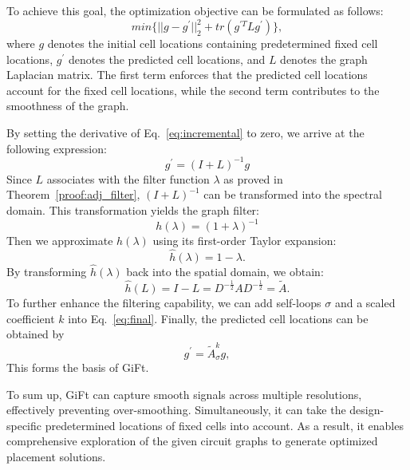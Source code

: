 To achieve this goal, the optimization objective can be formulated as follows:
\begin{equation}\label{eq:incremental}
min\{||g-g^{\prime}||_{2}^{2}+tr(g^{\prime T}Lg^{\prime})\},
\end{equation}
where $g$ denotes the initial cell locations containing predetermined fixed cell locations, $g^{\prime}$ denotes the predicted cell locations, and $L$ denotes the graph Laplacian matrix. 
The first term enforces that the predicted cell locations account for the fixed cell locations, while the second term contributes to the smoothness of the graph.

By setting the derivative of Eq.~\ref{eq:incremental} to zero, we arrive at the following expression:
\begin{equation}\label{eq:derivative}
g^{\prime}=(I+L)^{-1}g
\end{equation}
Since $L$ associates with the filter function $\lambda$ as proved in Theorem~\ref{proof:adj_filter}, $(I+L)^{-1}$ can be transformed into the spectral domain. This transformation yields the graph filter:
\begin{equation}\label{eq:spectral}
h(\lambda)=(1+\lambda)^{-1}
\end{equation}
Then we approximate $h(\lambda)$ using its first-order Taylor expansion: 
\begin{equation}\label{eq:taylor}
\hat{h}(\lambda)=1-\lambda.
\end{equation}
By transforming $\hat{h}(\lambda)$ back into the spatial domain, we obtain:
\begin{equation}\label{eq:final}
\hat{h}(L)=I-L=D^{-\frac{1}{2}}AD^{-\frac{1}{2}}=\tilde{A}.
\end{equation}
To further enhance the filtering capability, we can add self-loops $\sigma$ and a scaled coefficient $k$ into Eq.~\ref{eq:final}. 
Finally, the predicted cell locations can be obtained by
\begin{equation}\label{eq:final}
g^{\prime}=\tilde{A}_{\sigma}^kg,
\end{equation}
This forms the basis of GiFt.

To sum up, GiFt can capture smooth signals across multiple resolutions, effectively preventing over-smoothing. Simultaneously, it can take the design-specific predetermined locations of fixed cells into account. As a result, it enables comprehensive exploration of the given circuit graphs to generate optimized placement solutions.



